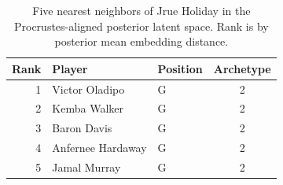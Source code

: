 \begin{table}[htbp]
  \centering\small
  \begin{tabular}{rllc}
    \toprule
    Rank & Player & Position & Archetype \\
    \midrule
    1 & Victor Oladipo & G & 2 \\
    2 & Kemba Walker & G & 2 \\
    3 & Baron Davis & G & 2 \\
    4 & Anfernee Hardaway & G & 2 \\
    5 & Jamal Murray & G & 2 \\
    \bottomrule
  \end{tabular}
  \caption{Five nearest neighbors of Jrue Holiday in the Procrustes-aligned posterior latent space. Rank is by posterior mean embedding distance.}
  \label{tab:Jrue_Holiday_neighbors}
\end{table}

